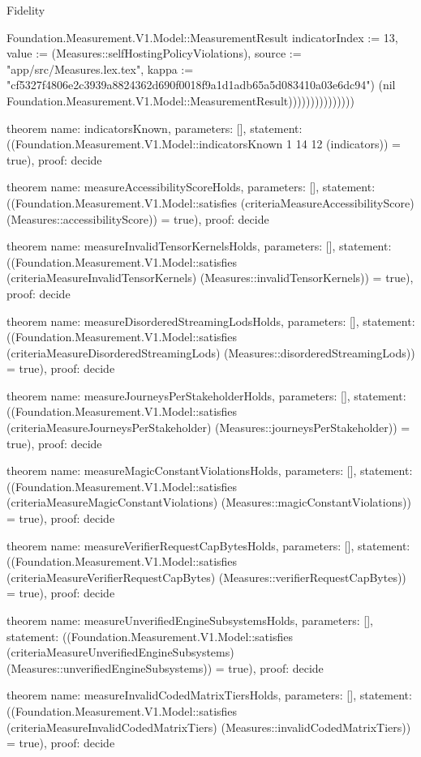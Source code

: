 \begin{lexlean}{Fidelity}
\begin{semanticmodule}
{Foundation.Measurement.V1.Model::MeasurementResult {indicatorIndex := 13, value := (Measures::selfHostingPolicyViolations), source := "app/src/Measures.lex.tex", kappa := "cf5327f4806e2c3939a8824362d690f0018f9a1d1adb65a5d083410a03e6dc94"}) (nil Foundation.Measurement.V1.Model::MeasurementResult)))))))))))))))
}

theorem{
  name: indicatorsKnown,
  parameters: [],
  statement: ((Foundation.Measurement.V1.Model::indicatorsKnown 1 14 12 (indicators)) = true),
  proof: decide{}
}

theorem{
  name: measureAccessibilityScoreHolds,
  parameters: [],
  statement: ((Foundation.Measurement.V1.Model::satisfies (criteriaMeasureAccessibilityScore) (Measures::accessibilityScore)) = true),
  proof: decide{}
}

theorem{
  name: measureInvalidTensorKernelsHolds,
  parameters: [],
  statement: ((Foundation.Measurement.V1.Model::satisfies (criteriaMeasureInvalidTensorKernels) (Measures::invalidTensorKernels)) = true),
  proof: decide{}
}

theorem{
  name: measureDisorderedStreamingLodsHolds,
  parameters: [],
  statement: ((Foundation.Measurement.V1.Model::satisfies (criteriaMeasureDisorderedStreamingLods) (Measures::disorderedStreamingLods)) = true),
  proof: decide{}
}

theorem{
  name: measureJourneysPerStakeholderHolds,
  parameters: [],
  statement: ((Foundation.Measurement.V1.Model::satisfies (criteriaMeasureJourneysPerStakeholder) (Measures::journeysPerStakeholder)) = true),
  proof: decide{}
}

theorem{
  name: measureMagicConstantViolationsHolds,
  parameters: [],
  statement: ((Foundation.Measurement.V1.Model::satisfies (criteriaMeasureMagicConstantViolations) (Measures::magicConstantViolations)) = true),
  proof: decide{}
}

theorem{
  name: measureVerifierRequestCapBytesHolds,
  parameters: [],
  statement: ((Foundation.Measurement.V1.Model::satisfies (criteriaMeasureVerifierRequestCapBytes) (Measures::verifierRequestCapBytes)) = true),
  proof: decide{}
}

theorem{
  name: measureUnverifiedEngineSubsystemsHolds,
  parameters: [],
  statement: ((Foundation.Measurement.V1.Model::satisfies (criteriaMeasureUnverifiedEngineSubsystems) (Measures::unverifiedEngineSubsystems)) = true),
  proof: decide{}
}

theorem{
  name: measureInvalidCodedMatrixTiersHolds,
  parameters: [],
  statement: ((Foundation.Measurement.V1.Model::satisfies (criteriaMeasureInvalidCodedMatrixTiers) (Measures::invalidCodedMatrixTiers)) = true),
  proof: decide{}
}


\end{semanticmodule}
\end{lexlean}
